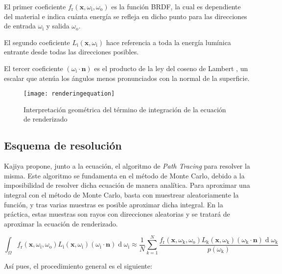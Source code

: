 El primer coeficiente $f_{\text{r}}(\mathbf {x} ,\omega _{\text{i}},\omega _{\text{o}})$ es la función BRDF, la cual es dependiente del material e indica cuánta energía se refleja en dicho punto para las direcciones de entrada $\omega _{\text{i}}$ y salida $\omega _{\text{o}}$.

El segundo coeficiente $L_{\text{i}}(\mathbf {x} ,\omega _{\text{i}})$ hace referencia a toda la energía lumínica entrante desde todas las direcciones posibles.

El tercer coeficiente $(\omega _{\text{i}}\cdot \mathbf {n})$ es el producto de la ley del coseno de Lambert \cite{lambert1760jh}, un escalar que atenúa los ángulos menos pronunciados con la normal de la superficie.

\begin{figure}[H]
    \centering
	\texttt{[image: renderingequation]}
	\caption{Interpretación geométrica del término de integración de la ecuación de renderizado}
	\label{fig:renderingequation}
\end{figure}


	\subsection{Esquema de resolución}
	\label{subsec:montecarlo}
Kajiya \cite{kajiya1986rendering} propone, junto a la ecuación, el algoritmo de \emph{Path Tracing} para resolver la misma. Este algoritmo se fundamenta en el método de Monte Carlo, debido a la imposibilidad de resolver dicha ecuación de manera analítica.
Para aproximar una integral con el método de Monte Carlo, basta con muestrear aleatoriamente la función, y tras varias muestras es posible aproximar dicha integral. En la práctica, estas muestras son rayos con direcciones aleatorias y se tratará de aproximar la ecuación de renderizado. 

\[
{\int _{\Omega }f_{\text{r}}(\mathbf {x} ,\omega _{\text{i}},\omega _{\text{o}})L_{\text{i}}(\mathbf {x} ,\omega _{\text{i}})(\omega _{\text{i}}\cdot \mathbf {n} )\operatorname {d} \omega _{\text{i}} \approx \displaystyle \frac{1}{N}\sum\limits_{k=1}^{N}\frac{f_{\text{r}}(\mathbf {x} ,\omega _{\text{k}},\omega _{\text{o}})L_{\text{k}}(\mathbf {x} ,\omega _{\text{k}})(\omega _{\text{k}}\cdot \mathbf {n} )\operatorname {d} \omega _{\text{k}}}{p(\omega _{\text{k}})}}
\]

Así pues, el procedimiento general es el siguiente:

